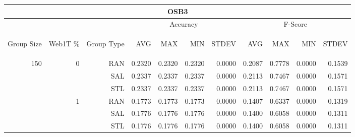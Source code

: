 \begin{center}
\begin{table}[htbp] 
 \begin{center}
\begin{tabular}{ | r | r | r | r | r | r | r | r | r | r | r |}
\hline
\multicolumn{11}{|c|}{OSB3}\\
\hline
 & & & \multicolumn{4}{|c|}{Accuracy} & \multicolumn{4}{|c|}{F-Score}\\ \cline{4-11}
\begin{sideways}Group Size\end{sideways} & \begin{sideways}Web1T \%\end{sideways} & \begin{sideways}Group Type\end{sideways} & \begin{sideways}AVG\end{sideways} & \begin{sideways}MAX\end{sideways} & \begin{sideways}MIN\end{sideways} & \begin{sideways}STDEV\end{sideways} & \begin{sideways}AVG\end{sideways} & \begin{sideways}MAX\end{sideways} & \begin{sideways}MIN\end{sideways} & \begin{sideways}STDEV\end{sideways}\\
\hline
\multirow{18}{*}{150}
 & \multirow{3}{*}{0} & RAN & 0.2320 & 0.2320 & 0.2320 & 0.0000 & 0.2087 & 0.7778 & 0.0000 & 0.1539\\ \cline{3-11}
 &   & SAL & 0.2337 & 0.2337 & 0.2337 & 0.0000 & 0.2113 & 0.7467 & 0.0000 & 0.1571\\ \cline{3-11}
 &   & STL & 0.2337 & 0.2337 & 0.2337 & 0.0000 & 0.2113 & 0.7467 & 0.0000 & 0.1571\\ \cline{2-11}
 & \multirow{3}{*}{1} & RAN & 0.1773 & 0.1773 & 0.1773 & 0.0000 & 0.1407 & 0.6337 & 0.0000 & 0.1319\\ \cline{3-11}
 &   & SAL & 0.1776 & 0.1776 & 0.1776 & 0.0000 & 0.1400 & 0.6058 & 0.0000 & 0.1311\\ \cline{3-11}
 &   & STL & 0.1776 & 0.1776 & 0.1776 & 0.0000 & 0.1400 & 0.6058 & 0.0000 & 0.1311\\ \cline{2-11}

\end{tabular}
\end{center}
\end{table}
\end{center}
